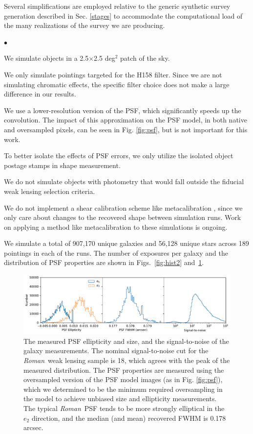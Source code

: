 \documentclass[usenatbib]{mnras}
\newcommand{\wfirst}{{\slshape Roman}}
\begin{document}
Several simplifications are employed relative to the generic synthetic survey generation described in Sec. \ref{stages} to accommodate the computational load of the many realizations of the survey we are producing. 
\begin{list}{$\bullet$}{}
\item We simulate objects in a 2.5$\times$2.5 deg$^2$ patch of the sky.
\item We only simulate pointings targeted for the H158 filter.
Since we are not simulating chromatic effects, the specific filter choice does not make a large difference in our results.
\item We use a lower-resolution version of the PSF, which significantly speeds up the convolution.
The impact of this approximation on the PSF model, in both native and oversampled pixels, can be seen in Fig. \ref{fig:psf}, but is not important for this work.
\item To better isolate the effects of PSF errors, we only utilize the isolated object postage stamps in shape measurement.
\item We do not simulate objects with photometry that would fall outside the fiducial weak lensing selection criteria.
\item We do not implement a shear calibration scheme like metacalibration \citep{SheldonHuff2017}, since we only care about changes to the recovered shape between simulation runs. Work on applying a method like metacalibration to these simulations is ongoing.
\end{list}

We simulate a total of 907,170 unique galaxies and 56,128 unique stars across 189 pointings in each of the runs. The number of exposures per galaxy and the distribution of PSF properties are shown in Figs.~\ref{fig:hist2} and~\ref{fig:hist3}.

\begin{figure}
\begin{center}
\includegraphics[width=\textwidth]{figures/hist3.pdf}
\end{center}
\caption[]{
The measured PSF ellipticity and size, and the signal-to-noise of the galaxy measurements. The nominal signal-to-noise cut for the \wfirst\ weak lensing sample is 18, which agrees with the peak of the measured distribution. The PSF properties are measured using the oversampled version of the PSF model images (as in Fig. \ref{fig:psf}), which we determined to be the minimum required oversampling in the model to achieve unbiased size and ellipticity measurements. The typical \wfirst\ PSF tends to be more strongly elliptical in the $e_2$ direction, and the median (and mean) recovered FWHM is 0.178 arcsec.
\label{fig:hist3}}
\end{figure}
\end{document}
